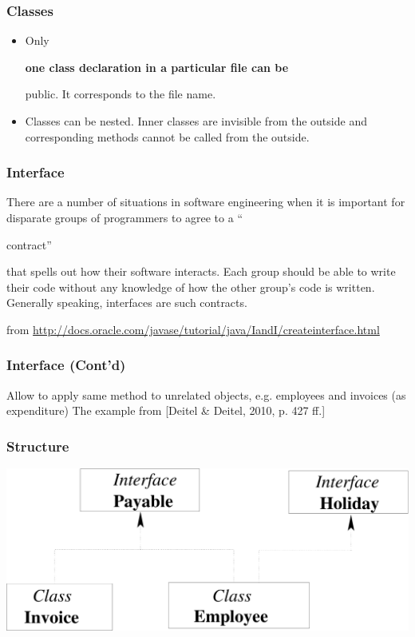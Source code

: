\documentclass{beamer}
\def\mcolor#1#2{\rule{0ex}{0ex}\color{#1}#2\color{black}{}}
\begin{document}
\begin{frame}
\frametitle{Classes}

\begin{itemize}
\item Only \mcolor{blue}{\bf one class declaration} in a particular
  file can be \mcolor{blue}{public}. It corresponds to the file
  name.
\item Classes can be nested. Inner classes are invisible from the
  outside and corresponding methods cannot be called from the outside.
\end{itemize}
\end{frame}


\begin{frame}
\frametitle{Interface}

\mcolor{blue}{There are a number of situations in software engineering
  when it is important for disparate groups of programmers to agree to
  a} ``\mcolor{red}{contract}'' \mcolor{blue}{that spells out how their software
  interacts. Each group should be able to write their code without any
  knowledge of how the other group's code is written. Generally
  speaking, interfaces are such contracts.}

\begin{footnotesize}
from \url{http://docs.oracle.com/javase/tutorial/java/IandI/createinterface.html}
\end{footnotesize}
\end{frame}

\begin{frame}
\frametitle{Interface (Cont'd)}
\mcolor{blue}{Allow to apply same method to unrelated objects,
    e.g. employees and invoices (as expenditure)}
  The example from [Deitel \& Deitel, 2010, p. 427 ff.]

\renewcommand{\baselinestretch}{0.9}
\begin{small}

\end{small}
\end{frame}
\begin{frame}
\frametitle{Structure}

\begin{center}
\includegraphics[height=.4\textheight]{structure}
\end{center}

\end{frame}
\end{document}
